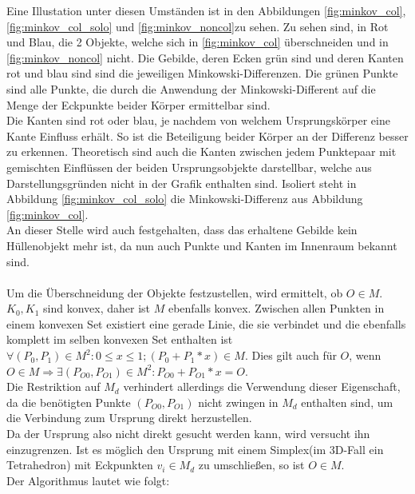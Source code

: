 Eine Illustation unter diesen Umständen ist in den Abbildungen \ref{fig:minkov_col}, \ref{fig:minkov_col_solo} und \ref{fig:minkov_noncol}zu sehen. Zu sehen sind, in Rot und Blau, die 2 Objekte, welche sich in \ref{fig:minkov_col} überschneiden und in \ref{fig:minkov_noncol} nicht. Die Gebilde, deren Ecken grün sind und deren Kanten rot und blau sind sind die jeweiligen Minkowski-Differenzen.
Die grünen Punkte sind alle Punkte, die durch die Anwendung der Minkowski-Different auf die Menge der Eckpunkte beider Körper ermittelbar sind.\\
Die Kanten sind rot oder blau, je nachdem von welchem Ursprungskörper eine Kante Einfluss erhält. So ist die Beteiligung beider Körper an der Differenz besser zu erkennen. Theoretisch sind auch die Kanten zwischen jedem Punktepaar mit gemischten Einflüssen der beiden Ursprungsobjekte darstellbar, welche aus Darstellungsgründen nicht in der Grafik enthalten sind. Isoliert steht in Abbildung \ref{fig:minkov_col_solo} die Minkowski-Differenz aus Abbildung \ref{fig:minkov_col}.\\
An dieser Stelle wird auch festgehalten, dass das erhaltene Gebilde kein Hüllenobjekt mehr ist, da nun auch Punkte und Kanten im Innenraum bekannt sind.\\
\\
Um die Überschneidung der Objekte festzustellen, wird ermittelt, ob $O\in M$.\\
$K_0, K_1$ sind konvex, daher ist $M$ ebenfalls konvex. Zwischen allen Punkten in einem konvexen Set existiert eine gerade Linie, die sie verbindet und die ebenfalls komplett im selben konvexen Set enthalten ist $\forall (P_0, P_1)\in M^2 : 0 \le x \le 1 ; (P_0 + P_1*x) \in M$. Dies gilt auch für $O$, wenn $O\in M \Rightarrow \exists (P_{O0}, P_{O1}) \in M^2 : P_{O0} + P_{O1}*x = O$.\\
Die Restriktion auf $M_d$ verhindert allerdings die Verwendung dieser Eigenschaft, da die benötigten Punkte $(P_{O0}, P_{O1})$ nicht zwingen in $M_d$ enthalten sind, um die Verbindung zum Ursprung direkt herzustellen.\\
Da der Ursprung also nicht direkt gesucht werden kann, wird versucht ihn einzugrenzen. Ist es möglich den Ursprung mit einem Simplex(im 3D-Fall ein Tetrahedron) mit Eckpunkten $v_i \in M_d$ zu umschließen, so ist $O\in M$.\\
Der Algorithmus lautet wie folgt:
